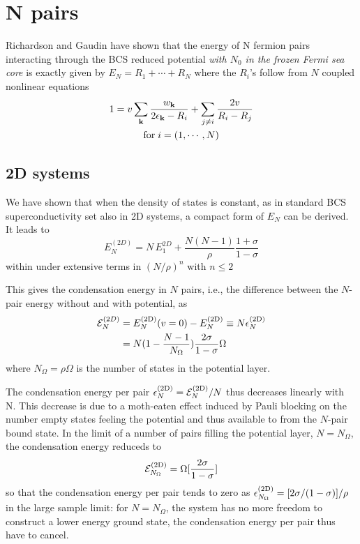\documentclass[aps,prb,showpacs,reprint]{revtex4-1}
\begin{document}
\section{N pairs\label{sec:NPair}}
Richardson \cite{Richardson1} and Gaudin \cite{gaudin} have shown that the energy of N fermion pairs interacting through the BCS reduced potential \emph{with $N_0$ in the frozen Fermi sea core} is exactly given by $E_N=R_1+\cdots+R_N$ where the $R_i$'s follow from $N$ coupled nonlinear equations 
\begin{multline}
 1=v\sum_{\mathbf{k}}\frac{w_{\mathbf{k}}}{2\epsilon_{\mathbf{k}}-R_i}+\sum_{j\neq{}i}\frac{2v}{R_i-R_j}\\\text{for}\;i=(1,\cdots,N)
\end{multline}
\subsection{2D systems}
We have shown that when the density of states is constant, as in standard BCS superconductivity set also in 2D systems, a compact form of $E_N$ can be derived. It leads to 
\begin{equation}
 E^(2D)_N=N\,E^{2D}_1+\frac{N(N-1)}{\rho}\frac{1+\sigma}{1-\sigma}
\end{equation}
within under extensive terms in $(N/\rho)^n$ with $n\leq2$

This gives the condensation energy in $N$ pairs, i.e., the difference between the $N$-pair energy without and with potential, as 
\begin{equation}\label{eq:E2D}
\begin{split}
 \mathcal{E}^{(2D)}_N&=E_N^{{{\text{(2D)}}}}(v=0)-E_N^{{\text{(2D)}}}\equiv{}N\epsilon_N^{{\text{(2D)}}}\\
&=N(1-\frac{N-1}{N_\Omega})\frac{2\sigma}{1-\sigma}\Omega
\end{split}
\end{equation}
where $N_\Omega=\rho\Omega$ is the number of states in the potential layer. 

The condensation energy per pair $\epsilon^{{\text{(2D)}}}_N=\mathcal{E}^{{\text{(2D)}}}_N/N$ thus decreases linearly with N. This decrease is due to a moth-eaten effect induced by Pauli blocking on the number empty states feeling the potential and thus available to from the $N$-pair bound state.  In the limit of a number of pairs filling the potential layer, $N=N_\Omega$, the condensation energy reduceds to 
\begin{equation}
 \mathcal{E}^{{\text{(2D)}}}_{N_\Omega}=\Omega[\frac{2\sigma}{1-\sigma}]
\end{equation}
so that the condensation energy per pair tends to zero as $\epsilon^{{\text{(2D)}}}_{N_\Omega}=[2\sigma/(1-\sigma)]/\rho$ in the large sample limit: for $N=N_\Omega$, the system has no more freedom to construct a lower energy ground state, the condensation energy per pair thus have to cancel.  
\end{document}

